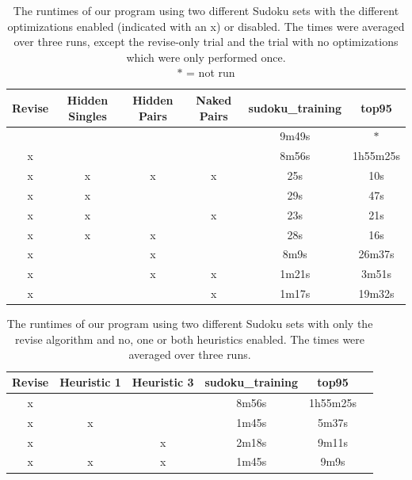 \documentclass[11pt]{article} %
\begin{document}
\begin{table}[hp]
\begin{center}
\begin{tabular}{c c c c c c}
\hline
 Revise & Hidden Singles & Hidden Pairs & Naked Pairs & sudoku\_training & top95 \\
\hline
 &  &  &  & 9m49s & $*$ \\ %
x &  &  &  & 8m56s & 1h55m25s \\ %
x & x & x & x & 25s & 10s \\ %
x & x &  &  & 29s & 47s \\ %
x & x &  & x & 23s & 21s \\ %
x & x & x &  & 28s & 16s \\ %
x &   & x &  & 8m9s & 26m37s \\ %
x &   & x & x & 1m21s & 3m51s \\ %
x &  &  & x & 1m17s & 19m32s \\ %
\hline
\end{tabular}
\end{center}
\caption{The runtimes of our program using two different Sudoku sets with the different optimizations enabled (indicated with an x) or disabled. The times were averaged over three runs, except the revise-only trial and the trial with no optimizations which were only performed once.\\ $*$ = not run}
\label{tab:tech_results}
\end{table}

\begin{table}[hp]
\begin{center}
\begin{tabular}{c c c c c c}
\hline
 Revise & Heuristic 1 & Heuristic 3 & sudoku\_training & top95 \\
\hline
x &  &  & 8m56s & 1h55m25s \\ %
x & x &  & 1m45s & 5m37s \\ %
x &  & x & 2m18s & 9m11s \\ %
x & x & x & 1m45s & 9m9s \\ %
\hline
\end{tabular}
\end{center}
\caption{The runtimes of our program using two different Sudoku sets with only the revise algorithm and no, one or both heuristics enabled.  The times were averaged over three runs.}
\label{tab:heur_results}
\end{table}
\end{document}
